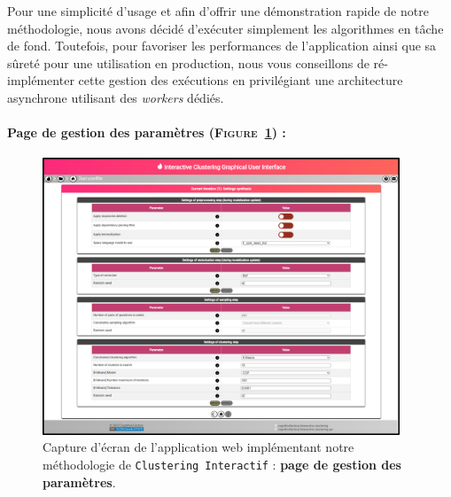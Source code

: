 			\begin{leftBarWarning}
				Pour une simplicité d'usage et afin d'offrir une démonstration rapide de notre méthodologie, nous avons décidé d'exécuter simplement les algorithmes en tâche de fond.
				Toutefois, pour favoriser les performances de l'application ainsi que sa sûreté pour une utilisation en production, nous vous conseillons de ré-implémenter cette gestion des exécutions en privilégiant une architecture asynchrone utilisant des \textit{workers} dédiés.
			\end{leftBarWarning}
		
		
		\paragraph{Page de gestion des paramètres (\textsc{Figure~\ref{figure:C-WEB-APPLICATION-PARAMETRAGE}}) :}
		
			\begin{figure}[H]
				\centering
				\includegraphics[width=0.95\textwidth]{figures/interactive-clustering-application-parametres}
				\caption{
					Capture d'écran de l'application web implémentant notre méthodologie de \texttt{Clustering Interactif} : \textbf{page de gestion des paramètres}.
				}
				\label{figure:C-WEB-APPLICATION-PARAMETRAGE}
			\end{figure}
			
